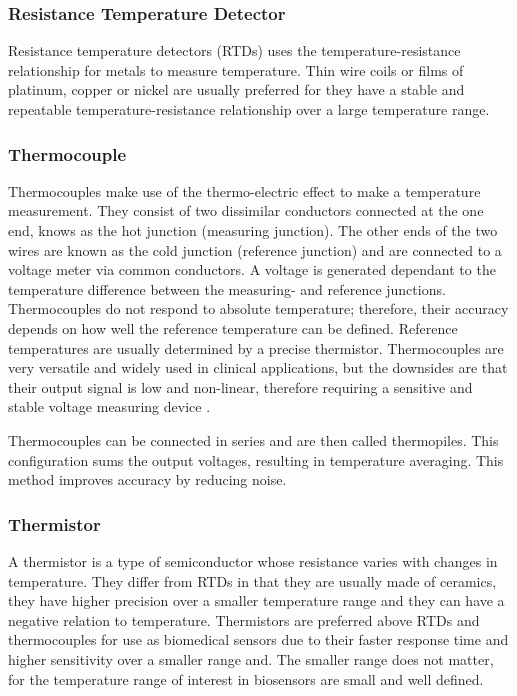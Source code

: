 \subsubsection{Resistance Temperature Detector}

Resistance temperature detectors (RTDs) uses the temperature-resistance relationship for metals to measure temperature. Thin wire coils or films of platinum, copper or nickel are usually preferred for they have a stable and repeatable temperature-resistance relationship over a large temperature range.

\subsubsection{Thermocouple}
Thermocouples make use of the thermo-electric effect to make a temperature measurement. They consist of two dissimilar conductors connected at the one end, knows as the hot junction (measuring junction). The other ends of the two wires are known as the cold junction (reference junction) and are connected to a voltage meter via common conductors. A voltage is generated dependant to the temperature difference between the measuring- and reference junctions. Thermocouples do not respond to absolute temperature; therefore, their accuracy depends on how well the reference temperature can be defined. Reference temperatures are usually determined by a precise thermistor. Thermocouples are very versatile and widely used in clinical applications, but the downsides are that their output signal is low and non-linear, therefore requiring a sensitive and stable voltage measuring device \citep{jones2010biomedical}.

\medskip

Thermocouples can be connected in series and are then called thermopiles. This configuration sums the output voltages, resulting in temperature averaging. This method improves accuracy by reducing noise. 

\subsubsection{Thermistor}
A thermistor is a type of semiconductor whose resistance varies with changes in temperature. They differ from RTDs in that they are usually made of ceramics, they have higher precision over a smaller temperature range and they can have a negative relation to temperature. Thermistors are preferred above RTDs and thermocouples for use as biomedical sensors due to their faster response time and higher sensitivity over a smaller range and. The smaller range does not matter, for the temperature range of interest in biosensors are small and well defined. 

